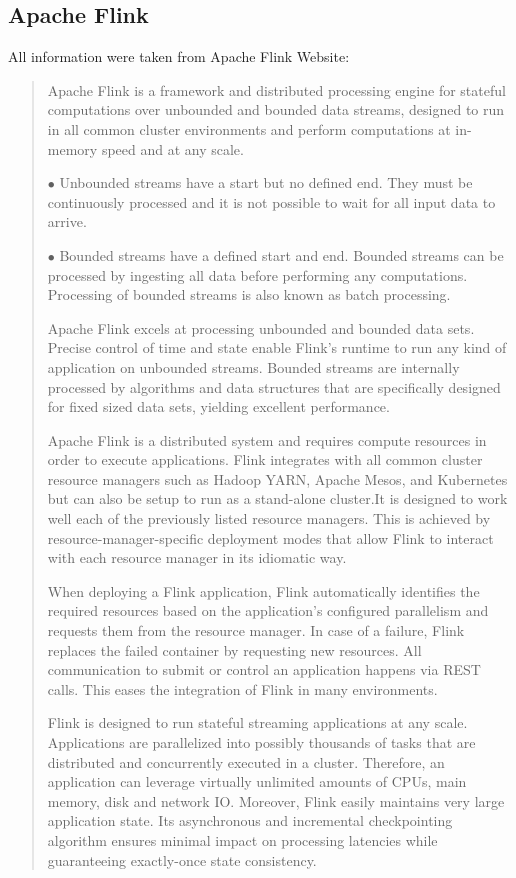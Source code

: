 \subsection{Apache Flink}
All information were taken from Apache Flink Website: 
\begin{quote}
Apache Flink is a framework and distributed processing engine for stateful computations over unbounded and bounded data streams, designed to run in all common cluster environments and perform computations at in-memory speed and at any scale.
    \begin{description}
    \item $\bullet$ Unbounded streams have a start but no defined end. They must be continuously processed and it is not possible to wait for all input data to arrive.
    \item $\bullet$ Bounded streams have a defined start and end. Bounded streams can be processed by ingesting all data before performing any computations. Processing of bounded streams is also known as batch processing.
    \end{description}
    
Apache Flink excels at processing unbounded and bounded data sets. Precise control of time and state enable Flink’s runtime to run any kind of application on unbounded streams. Bounded streams are internally processed by algorithms and data structures that are specifically designed for fixed sized data sets, yielding excellent performance.


Apache Flink is a distributed system and requires compute resources in order to execute applications. Flink integrates with all common cluster resource managers such as Hadoop YARN, Apache Mesos, and Kubernetes but can also be setup to run as a stand-alone cluster.It is designed to work well each of the previously listed resource managers. This is achieved by resource-manager-specific deployment modes that allow Flink to interact with each resource manager in its idiomatic way.


When deploying a Flink application, Flink automatically identifies the required resources based on the application’s configured parallelism and requests them from the resource manager. In case of a failure, Flink replaces the failed container by requesting new resources. All communication to submit or control an application happens via REST calls. This eases the integration of Flink in many environments.


Flink is designed to run stateful streaming applications at any scale. Applications are parallelized into possibly thousands of tasks that are distributed and concurrently executed in a cluster. Therefore, an application can leverage virtually unlimited amounts of CPUs, main memory, disk and network IO. Moreover, Flink easily maintains very large application state. Its asynchronous and incremental checkpointing algorithm ensures minimal impact on processing latencies while guaranteeing exactly-once state consistency.



\end{quote}

